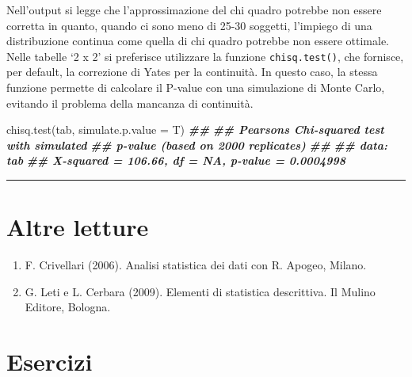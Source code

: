 \documentclass[
  12pt,
]{book}
\newenvironment{Shaded}{\begin{snugshade}}{\end{snugshade}}
\newcommand{\AttributeTok}[1]{\textcolor[rgb]{0.77,0.63,0.00}{#1}}
\newcommand{\DocumentationTok}[1]{\textcolor[rgb]{0.56,0.35,0.01}{\textbf{\textit{#1}}}}
\newcommand{\FunctionTok}[1]{\textcolor[rgb]{0.00,0.00,0.00}{#1}}
\newcommand{\NormalTok}[1]{#1}
\providecommand{\tightlist}{%
  \setlength{\itemsep}{0pt}\setlength{\parskip}{0pt}}
\begin{document}
Nell'output si legge che l'approssimazione del chi quadro potrebbe non essere corretta in quanto, quando ci sono meno di 25-30 soggetti, l'impiego di una distribuzione continua come quella di chi quadro potrebbe non essere ottimale. Nelle tabelle `2 x 2' si preferisce utilizzare la funzione \texttt{chisq.test()}, che fornisce, per default, la correzione di Yates per la continuità. In questo caso, la stessa funzione permette di calcolare il P-value con una simulazione di Monte Carlo, evitando il problema della mancanza di continuità.

\begin{Shaded}
\begin{Highlighting}[]
\FunctionTok{chisq.test}\NormalTok{(tab, }\AttributeTok{simulate.p.value =}\NormalTok{ T)}
\DocumentationTok{\#\# }
\DocumentationTok{\#\#  Pearson\textquotesingle{}s Chi{-}squared test with simulated}
\DocumentationTok{\#\#  p{-}value (based on 2000 replicates)}
\DocumentationTok{\#\# }
\DocumentationTok{\#\# data:  tab}
\DocumentationTok{\#\# X{-}squared = 106.66, df = NA, p{-}value = 0.0004998}
\end{Highlighting}
\end{Shaded}

\begin{center}\rule{0.5\linewidth}{0.5pt}\end{center}

\hypertarget{altre-letture-13}{%
\section{Altre letture}\label{altre-letture-13}}

\begin{enumerate}
\def\labelenumi{\arabic{enumi}.}
\tightlist
\item
  F. Crivellari (2006). Analisi statistica dei dati con R. Apogeo, Milano.
\item
  G. Leti e L. Cerbara (2009). Elementi di statistica descrittiva. Il Mulino Editore, Bologna.
\end{enumerate}

\hypertarget{esercizi-6}{%
\section{Esercizi}\label{esercizi-6}}
\end{document}
